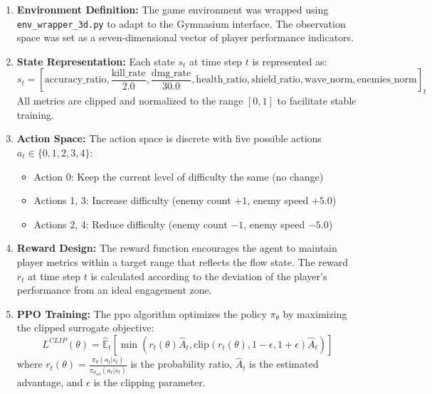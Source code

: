 \begin{enumerate}
	\item \textbf{Environment Definition:} The game environment was wrapped using \texttt{env\_wrapper\_3d.py} to adapt to the Gymnasium interface. The observation space was set as a seven-dimensional vector of player performance indicators.
	
	\item \textbf{State Representation:} Each state $s_t$ at time step $t$ is represented as:
	\begin{equation}
		s_t = [\text{accuracy\_ratio}, \frac{\text{kill\_rate}}{2.0}, \frac{\text{dmg\_rate}}{30.0}, \text{health\_ratio}, \text{shield\_ratio}, \text{wave\_norm}, \text{enemies\_norm}]_t
	\end{equation}
	All metrics are clipped and normalized to the range $[0, 1]$ to facilitate stable training.
	
	\item \textbf{Action Space:} The action space is discrete with five possible actions $a_t \in \{0, 1, 2, 3, 4\}$:
	\begin{itemize}
		\item Action 0: Keep the current level of difficulty the same (no change)
		\item Actions 1, 3: Increase difficulty (enemy count $+1$, enemy speed $+5.0$)
		\item Actions 2, 4: Reduce difficulty (enemy count $-1$, enemy speed $-5.0$)
	\end{itemize}
	
	\item \textbf{Reward Design:} The reward function encourages the agent to maintain player metrics within a target range that reflects the flow state. The reward $r_t$ at time step $t$ is calculated according to the deviation of the player's performance from an ideal engagement zone.
	
	\item \textbf{PPO Training:} The \ac{ppo} algorithm optimizes the policy $\pi_\theta$ by maximizing the clipped surrogate objective:
	\begin{equation}
		L^{CLIP}(\theta) = \hat{\mathbb{E}}_t \left[ \min \left( r_t(\theta) \hat{A}_t, \text{clip}(r_t(\theta), 1-\epsilon, 1+\epsilon) \hat{A}_t \right) \right]
	\end{equation}
	where $r_t(\theta) = \frac{\pi_\theta(a_t|s_t)}{\pi_{\theta_{old}}(a_t|s_t)}$ is the probability ratio, $\hat{A}_t$ is the estimated advantage, and $\epsilon$ is the clipping parameter.
	

\end{enumerate}
